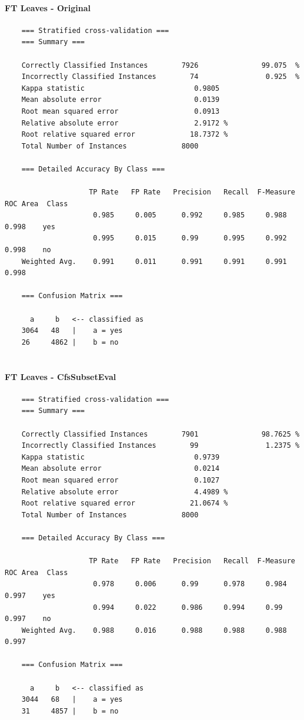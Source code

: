 \paragraph{FT Leaves - Original}
{\footnotesize
	\begin{verbatim}
	=== Stratified cross-validation ===
	=== Summary ===
	
	Correctly Classified Instances        7926               99.075  %
	Incorrectly Classified Instances        74                0.925  %
	Kappa statistic                          0.9805
	Mean absolute error                      0.0139
	Root mean squared error                  0.0913
	Relative absolute error                  2.9172 %
	Root relative squared error             18.7372 %
	Total Number of Instances             8000     
	
	=== Detailed Accuracy By Class ===
	
	                TP Rate   FP Rate   Precision   Recall  F-Measure   ROC Area  Class
	                 0.985     0.005      0.992     0.985     0.988      0.998    yes
	                 0.995     0.015      0.99      0.995     0.992      0.998    no
	Weighted Avg.    0.991     0.011      0.991     0.991     0.991      0.998
	
	=== Confusion Matrix ===
	
	  a     b   <-- classified as
	3064   48   |    a = yes
	26     4862 |    b = no
	
	\end{verbatim}
}

\paragraph{FT Leaves - CfsSubsetEval}
{\footnotesize
	\begin{verbatim}
	=== Stratified cross-validation ===
	=== Summary ===
	
	Correctly Classified Instances        7901               98.7625 %
	Incorrectly Classified Instances        99                1.2375 %
	Kappa statistic                          0.9739
	Mean absolute error                      0.0214
	Root mean squared error                  0.1027
	Relative absolute error                  4.4989 %
	Root relative squared error             21.0674 %
	Total Number of Instances             8000     
	
	=== Detailed Accuracy By Class ===
	
	                TP Rate   FP Rate   Precision   Recall  F-Measure   ROC Area  Class
	                 0.978     0.006      0.99      0.978     0.984      0.997    yes
	                 0.994     0.022      0.986     0.994     0.99       0.997    no
	Weighted Avg.    0.988     0.016      0.988     0.988     0.988      0.997
	
	=== Confusion Matrix ===
	
	  a     b   <-- classified as
	3044   68   |    a = yes
	31     4857 |    b = no
	
	\end{verbatim}
}

